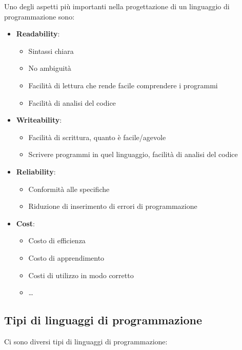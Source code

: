 \documentclass[a4paper]{article}
\begin{document}
Uno degli aspetti più importanti nella progettazione di un linguaggio di programmazione sono:
\begin{itemize}
    \item \textbf{Readability}: 
    \begin{itemize}
        \item Sintassi chiara 
        \item No ambiguità
        \item Facilità di lettura che rende facile comprendere i programmi
        \item Facilità di analisi del codice
    \end{itemize}
    \item \textbf{Writeability}: 
    \begin{itemize}
        \item Facilità di scrittura, quanto è facile/agevole
        \item Scrivere programmi in quel linguaggio, facilità di analisi del codice
    \end{itemize}

    \item \textbf{Reliability}: 
    \begin{itemize}
        \item Conformità alle specifiche 
        \item Riduzione di inserimento di errori di programmazione  
    \end{itemize}
    \item \textbf{Cost}: 
    \begin{itemize}
        \item Costo di efficienza
        \item Costo di apprendimento 
        \item Costi di utilizzo in modo corretto
        \item \dots
    \end{itemize}
\end{itemize}

\subsection{Tipi di linguaggi di programmazione}

Ci sono diversi tipi di linguaggi di programmazione:
\end{document}

